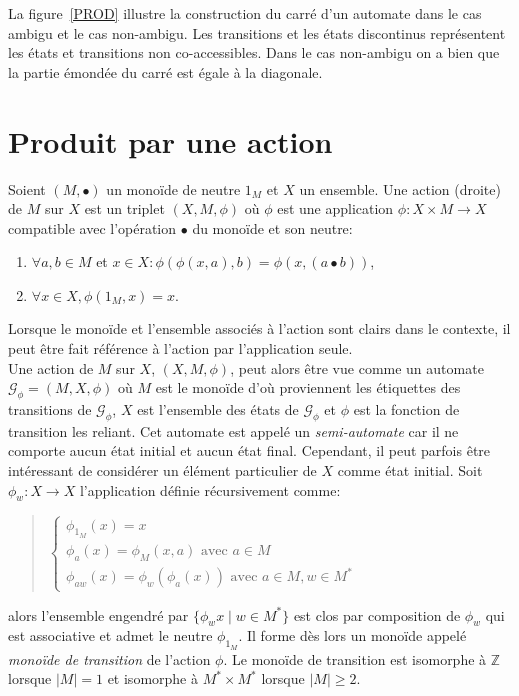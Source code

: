 	La figure~\ref{PROD} illustre la construction du carré d'un automate dans le cas ambigu et le cas non-ambigu. Les transitions et les états discontinus représentent les états et transitions non co-accessibles. Dans le cas non-ambigu on a bien que la partie émondée du carré est égale à la diagonale.
	
	

\section{Produit par une action}
	
	\begin{definition}
		Soient $(M, \bullet)$ un monoïde de neutre $1_M$ et $X$ un ensemble. Une action (droite) de $M$ sur $X$ est un triplet $(X, M, \phi)$ où $\phi$ est une application $\phi : X \times M \to X$ compatible avec l'opération $\bullet$ du monoïde et son neutre:
		\begin{enumerate}
			\item $\forall a,b \in M$ et $x \in X : \phi(\phi(x,a),b) = \phi(x, (a \bullet b))$,
			\item $\forall x \in X, \phi(1_M, x) = x$.
		\end{enumerate}
	\end{definition}
	
	Lorsque le monoïde et l'ensemble associés à l'action sont clairs dans le contexte, il peut être fait référence à l'action par l'application seule. \\
	Une action de $M$ sur $X$, $(X, M, \phi)$, peut alors être vue comme un automate $\mathscr{G}_\phi = (M, X, \phi)$ où $M$ est le monoïde d'où proviennent les étiquettes des transitions de $\mathscr{G}_\phi$, $X$ est l'ensemble des états de $\mathscr{G}_\phi$ et $\phi$ est la fonction de transition les reliant. Cet automate est appelé un \emph{semi-automate} car il ne comporte aucun état initial et aucun état final. Cependant, il peut parfois être intéressant de considérer un élément particulier de $X$ comme état initial. 
	Soit $\phi_w : X \to X$ l'application définie récursivement comme:
	
	\begin{quotation}
		$\begin{cases}
			\phi_{1_M}(x) = x \\
			\phi_a(x) = \phi_M(x,a) \text{ avec } a \in M \\
			\phi_{aw}(x) = \phi_w(\phi_a(x)) \text{ avec } a \in M, w \in M^*
		\end{cases}$
	\end{quotation}
	alors l'ensemble engendré par $\{\phi_w{x} \mid w \in M^*\}$ est clos par composition de $\phi_w$ qui est associative et admet le neutre $\phi_{1_M}$. Il forme dès lors un monoïde appelé \emph{monoïde de transition} de l'action $\phi$. Le monoïde de transition est isomorphe à $\mathbb{Z}$ lorsque $|M| = 1$ et isomorphe à $M^* \times M^*$ lorsque $|M| \geq 2$. %
	
